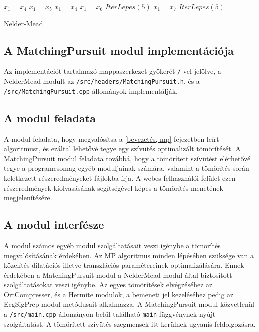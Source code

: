 \documentclass[oneside,titlepage,12pt,a4paper]{report}
\begin{document}
\newpage

\begin{algorithm}[htb!] 
\begin{algorithmic}[1]
		\State $x_1 = x_4$
			\State $x_1 = x_5$
		\Else
			\State $x_1 = x_4$
		\EndIf
				\State $x_1 = x_6$
			\Else
				\State $IterLepes(5)$
			\EndIf
				\State $x_1 = x_7$
			\Else
				\State $IterLepes(5)$
			\EndIf
		\EndIf
	\EndIf
	\EndFunction
\end{algorithmic}
\caption{Nelder-Mead}
\label{alg:NM}
\end{algorithm}

\newpage

\subsection{A MatchingPursuit modul implementációja}

Az implementációt tartalmazó mappaszerkezet gyökerét \texttt{/}-vel jelölve, a NelderMead modult  az \texttt{/src/headers/MatchingPursuit.h}, és a \texttt{/src/MatchingPursuit.cpp} állományok implementálják.

\subsection*{A modul feladata}

\par A modul feladata, hogy megvalósítsa a \ref{bevezetés, mp} fejezetben leírt algoritmust, és ezáltal lehetővé tegye egy szívütés optimalizált tömörítését. A MatchingPursuit modul feladata továbbá, hogy a tömörített szívütést elérhetővé tegye a programcsomag egyéb moduljainak számára, valamint a tömörítés során keletkezett részeredményeket fájlokba írja. A webes felhasználói felület ezen részeredmények kiolvasásának segítségével képes a tömörítés menetének megjelenítésére. 

\subsection*{A modul interfésze}

\par A modul számos egyéb modul szolgáltatásait veszi igénybe a tömörítés megvalósításának érdekében. Az MP algoritmus minden lépésében szüksége van a közelítés dilatációs illetve transzlációs paramétereinek optimalizálására. Ennek érdekében a MatchingPursuit modul a NelderMead modul által biztosított szolgáltatásokat veszi igénybe. Az egyes tömörítések elvégzéséhez az OrtCompresser, és a Hermite modulok, a bemeneti jel kezeléséhez pedig az EcgSigPrep modul metódusait alkalmazza. A MatchingPursuit modul közvetlenül a \texttt{/src/main.cpp} állományon belül található \texttt{main} függvénynek nyújt szolgáltatást. A tömörített szívütés szegmensek itt kerülnek ugyanis feldolgozásra. 
\end{document}
